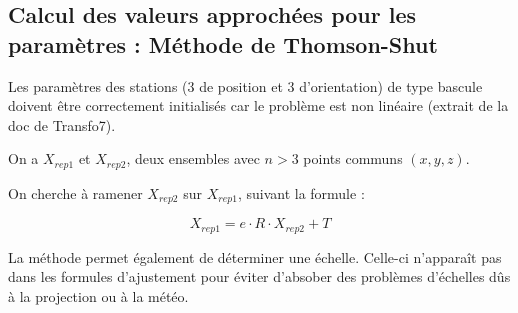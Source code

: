 \documentclass[french]{report}
\begin{document}
\subsection{Calcul des valeurs approchées pour les paramètres : Méthode de Thomson-Shut}\label{thomsonshut}
Les paramètres des stations (3 de position et 3 d'orientation) de type bascule doivent être correctement initialisés car le problème est non linéaire (extrait de la doc de Transfo7).

On a $X_{rep1}$ et $X_{rep2}$, deux ensembles avec $n>3$ points communs $\left( x,y,z\right)$.

On cherche à ramener $X_{rep2}$ sur $X_{rep1}$, suivant la formule :

$$X_{rep1}=e\cdot R \cdot X_{rep2} + T$$

La méthode permet également de déterminer une échelle. Celle-ci n'apparaît pas dans les formules d'ajustement pour éviter d'absober des problèmes
d'échelles dûs à la projection ou à la météo.
\end{document}
